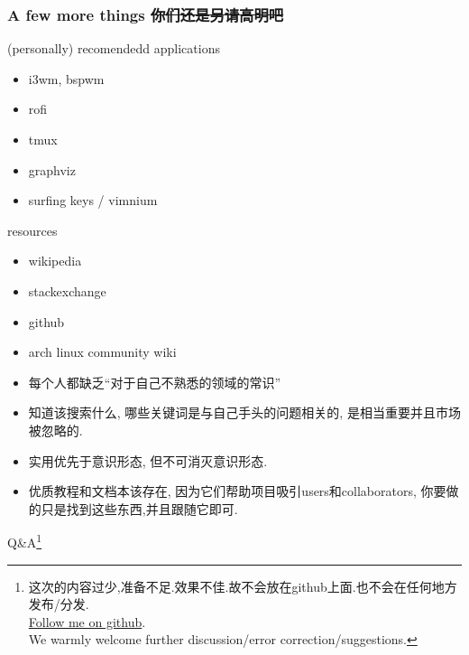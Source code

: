 \documentclass[8pt,t]{beamer}
\begin{document}

\begin{frame}
	\frametitle{A few more things \sout{你们还是另请高明吧}}
	\begin{block}{(personally) recomendedd applications}
		\begin{itemize}
			\item i3wm, bspwm
			\item rofi
			\item tmux
			\item graphviz
			\item surfing keys / vimnium
		\end{itemize}
	\end{block}

	\begin{block}{resources}
		\begin{itemize}
			\item wikipedia
			\item stackexchange
			\item github
			\item arch linux community wiki
		\end{itemize}
	\end{block}

	\begin{itemize}
		\item 每个人都缺乏``对于自己不熟悉的领域的常识''
		\item 知道该搜索什么, 哪些关键词是与自己手头的问题相关的, 是相当重要并且市场被忽略的.
		\item 实用优先于意识形态, 但不可消灭意识形态.
		\item 优质教程和文档本该存在, 因为它们帮助项目吸引users和collaborators, 你要做的只是找到这些东西,并且跟随它即可.
	\end{itemize}
\end{frame}



\begin{frame}[c]
	\centering \huge{Q\&A}\footnote{
		这次的内容过少,准备不足.效果不佳.\quad 故不会放在github上面.也不会在任何地方发布/分发.\\
		\href{github.com/hehelego/}{Follow me on github}.\\
		We warmly welcome further discussion/error correction/suggestions.
		}
\end{frame}
\end{document}
